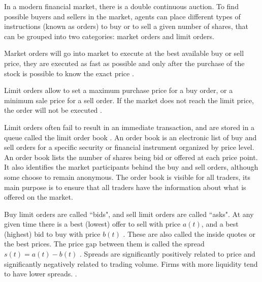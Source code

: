 
In a modern financial market, there is a double continuous auction. To find
possible buyers and sellers in the market, agents can place different types of
instructions (known as orders) to buy or to sell a given number of shares, that
can be grouped into two categories: market orders and limit orders.

Market orders will go into market to execute at the best available buy or sell
price, they are executed as fast as possible and only after the purchase of the
stock is possible to know the exact price \cite{large_prices_changes,predictive_pow}.

Limit orders allow to set a maximum purchase price for a buy order, or a
minimum sale price for a sell order. If the market does not reach the limit
price, the order will not be executed \cite{large_prices_changes,predictive_pow}.

Limit orders often fail to result in an immediate transaction, and are stored
in a queue called the limit order book \cite{prop_order_book,stat_prop,predictive_pow}. An order book is an electronic list of
buy and sell orders for a specific security or financial instrument organized
by price level. An order book lists the number of shares being bid or offered
at each price point. It also identifies the market participants behind the buy
and sell orders, although some choose to remain anonymous. The order book is
visible for all traders, its main purpose is to ensure that all traders have
the information about what is offered on the market.

Buy limit orders are called ``bids", and sell limit orders are called ``asks".
At any given time there is a best (lowest) offer to sell with price
$a\left(t\right)$, and a best (highest) bid to buy with price
$b\left(t\right)$ \cite{subtle_nature,account_spread,limit_ord_spread,prop_order_book}. These
are also called the inside quotes or the best prices. The price gap between
them is called the spread $s\left(t\right) = a\left(t\right)-b\left(t\right)$
\cite{subtle_nature,Bouchaud_2004,large_prices_changes,account_spread,market_digest}.
Spreads are significantly positively related to price and significantly
negatively related to trading volume. Firms with more liquidity tend to have
lower spreads.
\cite{account_spread,effects_spread,components_spread,components_spread_tokyo}.
